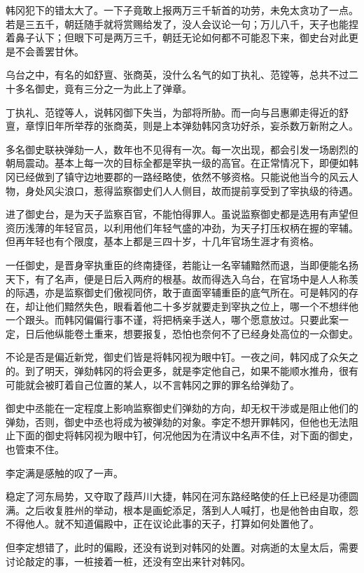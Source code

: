 韩冈犯下的错太大了。一下子竟敢上报两万三千斩首的功劳，未免太贪功了一点。若是三五千，朝廷随手就将赏赐给发了，没人会议论一句；万儿八千，天子也能捏着鼻子认下；但眼下可是两万三千，朝廷无论如何都不可能忍下来，御史台对此更是不会善罢甘休。

乌台之中，有名的如舒亶、张商英，没什么名气的如丁执礼、范镗等，总共不过二十多名御史，竟有三分之一为此上了弹章。

丁执礼、范镗等人，说韩冈御下失当，为部将所胁。而一向与吕惠卿走得近的舒亶，章惇旧年所举荐的张商英，则是上本弹劾韩冈贪功好杀，妄杀数万新附之人。

多名御史联袂弹劾一人，数年也不见得有一次。每一次出现，都会引发一场剧烈的朝局震动。基本上每一次的目标全都是宰执一级的高官。在正常情况下，即便如韩冈已经做到了镇守边地要郡的一路经略使，依然不够资格。只能说他当今的风云人物，身处风尖浪口，惹得监察御史们人人侧目，故而提前享受到了宰执级的待遇。

进了御史台，是为天子监察百官，不能怕得罪人。虽说监察御史都是选用有声望但资历浅薄的年轻官员，以利用他们年轻气盛的冲劲，为天子打压权柄在握的宰辅。但再年轻也有个限度，基本上都是三四十岁，十几年官场生涯才有资格。

一任御史，是晋身宰执重臣的终南捷径，若能让一名宰辅黯然而退，当即便能名扬天下，有了名声，便是日后入两府的根基。故而得选入乌台，在官场中是人人称羡的际遇，亦是监察御史们傲视同侪，敢于直面宰辅重臣的底气所在。可是韩冈的存在，却让他们黯然失色，眼看着他二十多岁就要走到宰执之位上，哪一个不想绊他一个跟头。而韩冈偏偏行事不谨，将把柄亲手送人，哪个愿意放过。只要此案一定，日后他纵能卷土重来，想要报复，恐怕也奈何不了已经身处高位的一众御史。

不论是否是偏近新党，御史们皆是将韩冈视为眼中钉。一夜之间，韩冈成了众矢之的。到了明天，弹劾韩冈的将会更多，就是李定他自己，如果不能顺水推舟，很有可能就会被盯着自己位置的某人，以不言韩冈之罪的罪名给弹劾了。

御史中丞能在一定程度上影响监察御史们弹劾的方向，却无权干涉或是阻止他们的弹劾，否则，御史中丞也将成为被弹劾的对象。李定不想开罪韩冈，但他也无法阻止下面的御史将韩冈视为眼中钉，何况他因为在清议中名声不佳，对下面的御史，也管束不住。

李定满是感触的叹了一声。

稳定了河东局势，又夺取了葭芦川大捷，韩冈在河东路经略使的任上已经是功德圆满。之后收复胜州的举动，根本是画蛇添足，落到人人喊打，也是他咎由自取，怨不得他人。就不知道偏殿中，正在议论此事的天子，打算如何处置他了。

但李定想错了，此时的偏殿，还没有说到对韩冈的处置。对病逝的太皇太后，需要讨论敲定的事，一桩接着一桩，还没有空出来针对韩冈。

